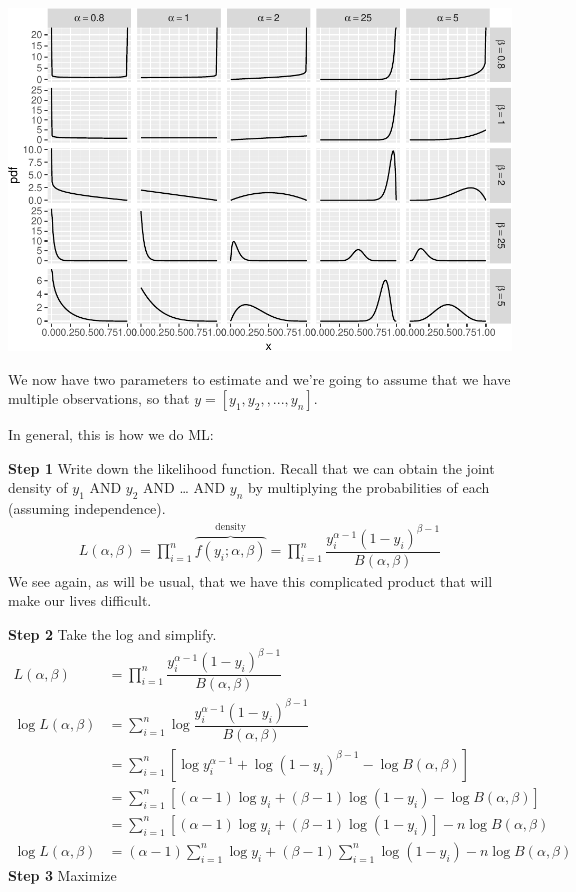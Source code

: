 \documentclass[
]{book}
\begin{document}
\includegraphics{01-01-maximum-likelihood_files/figure-latex/unnamed-chunk-3-1.pdf}

We now have two parameters to estimate and we're going to assume that we have multiple observations, so that \(y = [y_1, y_2, ,..., y_n]\).

In general, this is how we do ML:

\textbf{Step 1} Write down the likelihood function. Recall that we can obtain the joint density of \(y_1\) AND \(y_2\) AND \ldots{} AND \(y_n\) by multiplying the probabilities of each (assuming independence).
\[
\begin{aligned}
L(\alpha, \beta) = \displaystyle\prod_{i = 1}^n \overbrace{f(y_i;\alpha, \beta)}^{\text{density}} = \displaystyle\prod_{i = 1}^n \dfrac{y_i^{\alpha - 1}(1 - y_i)^{\beta - 1}}{B(\alpha, \beta)}
\end{aligned}
\]
We see again, as will be usual, that we have this complicated product that will make our lives difficult.

\textbf{Step 2} Take the log and simplify.
\[
\begin{aligned}
L(\alpha, \beta) &= \displaystyle\prod_{i = 1}^n \dfrac{y_i^{\alpha - 1}(1 - y_i)^{\beta - 1}}{B(\alpha, \beta)}\\
\log L(\alpha, \beta) &= \displaystyle\sum_{i = 1}^n \log \dfrac{y_i^{\alpha - 1}(1 - y_i)^{\beta - 1}}{B(\alpha, \beta)}\\
&= \displaystyle\sum_{i = 1}^n \left[ \log y_i^{\alpha - 1} + \log (1 - y_i)^{\beta - 1} - \log B(\alpha, \beta)\right]\\
&= \displaystyle\sum_{i = 1}^n \left[ (\alpha - 1)\log y_i + (\beta - 1)\log (1 - y_i) - \log B(\alpha, \beta)\right]\\
&= \displaystyle\sum_{i = 1}^n \left[ (\alpha - 1)\log y_i + (\beta - 1)\log (1 - y_i)\right] - n \log B(\alpha, \beta)\\
\log L(\alpha, \beta) &= (\alpha - 1) \sum_{i = 1}^n \log y_i + (\beta - 1) \sum_{i = 1}^n \log (1 - y_i) - n \log B(\alpha, \beta)
\end{aligned}
\]
\textbf{Step 3} Maximize
\end{document}
